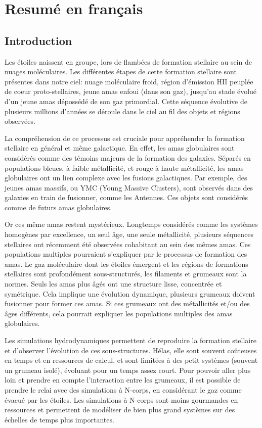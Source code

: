 \chapter{Resum\'e en français}


\section{Introduction}
 Les \'etoiles naissent en groupe, lors de flamb\'ees de formation stellaire au sein de nuages mol\'eculaires. Les diff\'erentes \'etapes de cette formation stellaire sont pr\'esentes dans notre ciel: nuage mol\'eculaire froid, r\'egion d'\'emission HII peupl\'ee de coeur proto-stellaires, jeune amas enfoui (dans son gaz), jusqu'au stade \'evolu\'e d'un jeune amas d\'eposs\'ed\'e de son gaz primordial. Cette s\'equence \'evolutive de plusieurs millions d'ann\'ees se d\'eroule dans le ciel au fil des objets et r\'egions observ\'ees. 
 
La compr\'ehension de ce processus est cruciale pour appr\'ehender la formation stellaire en g\'en\'eral et même galactique. En effet, les amas globulaires sont consid\'er\'es comme des t\'emoins majeurs de la formation des galaxies. S\'epar\'es en populations bleues, à faible m\'etallicit\'e, et rouge à haute m\'etallicit\'e, les amas globulaires ont un lien complexe avec les fusions galactiques. Par exemple, des jeunes amas massifs, ou YMC (Young Massive Clusters), sont observ\'es dans des galaxies en train de fusionner, comme les Antennes. Ces objets sont consid\'er\'es comme de futurs amas globulaires.

Or ces même amas restent myst\'erieux. Longtemps consid\'er\'es comme les syst\`emes homog\`enes par excellence, un seul âge, une seule m\'etallicit\'e, plusieurs s\'equences stellaires ont r\'ecemment \'et\'e observ\'ees cohabitant au sein des mêmes amas. Ces populations multiples pourraient s'expliquer par le processus de formation des amas. Le gaz mol\'eculaire dont les \'etoiles \'emergent et les r\'egions de formations stellaires sont profond\'ement sous-structur\'es, les filaments et grumeaux sont la normes. Seuls les amas plus âg\'es ont une structure lisse, concentr\'ee et sym\'etrique. Cela implique une \'evolution dynamique, plusieurs grumeaux doivent fusionner pour former ces amas. Si ces grumeaux ont des m\'etallicit\'es et/ou des âges diff\'erents, cela pourrait expliquer les populations multiples des amas globulaires.

Les simulations hydrodynamiques permettent de reproduire la formation stellaire et d'observer l'\'evolution de ces sous-structures. H\'elas, elle sont souvent coûteuses en temps et en ressources de calcul, et sont limit\'ees à des petit syst\`emes (souvent un grumeau isol\'e), \'evoluant pour un temps assez court. Pour pouvoir aller plus loin et prendre en compte l’interaction entre les grumeaux, il est possible de prendre le relai avec des simulations à N-corps, en consid\'erant le gaz comme \'evacu\'e par les \'etoiles. Les simulations à N-corps sont moins gourmandes en ressources et permettent de mod\'eliser de bien plus grand syst\`emes sur des \'echelles de temps plus importantes.

